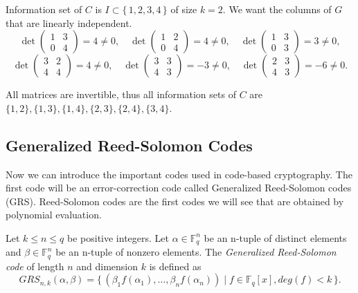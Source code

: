 \begin{solution}
    Information set of $C$ is $I \subset \{\,1,2,3,4\,\}$ of size $k=2$. We want the columns of $G$ that are linearly independent.\\

\begin{equation*}
    \det\begin{pmatrix}
        1&3\\0&4
    \end{pmatrix}=4\neq0, \quad
    \det\begin{pmatrix}
        1&2\\0&4
    \end{pmatrix}=4\neq0, \quad
    \det\begin{pmatrix}
        1&3\\0&3
    \end{pmatrix}=3\neq0,
\end{equation*}
\begin{equation*}
    \det\begin{pmatrix}
        3&2\\4&4
    \end{pmatrix}=4\neq0, \quad
    \det\begin{pmatrix}
        3&3\\4&3
    \end{pmatrix}=-3\neq0, \quad
    \det\begin{pmatrix}
        2&3\\4&3
    \end{pmatrix}=-6\neq0.
\end{equation*}
    
All matrices are invertible, thus all information sets of $C$ are $\{1,2\},\{1,3\},\{1,4\},\{2,3\},\{2,4\},\{3,4\}.$
\end{solution}

\subsection{Generalized Reed-Solomon Codes}
Now we can introduce the important codes used in code-based cryptography. The first code will be an error-correction code called Generalized Reed-Solomon codes (GRS). Reed-Solomon codes are the first codes we will see that are obtained by polynomial evaluation.

\begin{definition}
Let $k \leq n \leq q$ be positive integers. Let $\alpha \in \mathbb{F}_q^n$ be an n-tuple of distinct elements and $\beta \in \mathbb{F}_q^n$ be an n-tuple of nonzero elements. The \textit{Generalized Reed-Solomon code} of length $n$ and dimension $k$ is defined as
\[
GRS_{n,k}(\alpha, \beta) = \{\, (\beta_1f(\alpha_1), \dots, \beta_nf(\alpha_n)) \mid f \in \mathbb{F}_q[x], deg(f) < k \,\}.
\]
\end{definition}

